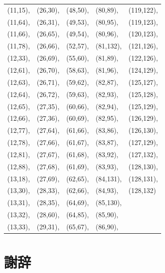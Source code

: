 \documentclass[a4,11pt]{article}
\begin{document}
\begin{center}
\begin{longtable}[p]{l l l l l}
(11,15),&(26,30),&(48,50),&(80,89),&(119,122),\\
(11,64),&(26,31),&(49,53),&(80,95),&(119,123),\\
(11,66),&(26,65),&(49,54),&(80,96),&(120,123),\\
(11,78),&(26,66),&(52,57),&(81,132),&(121,126),\\
(12,33),&(26,69),&(55,60),&(81,89),&(122,126),\\
(12,61),&(26,70),&(58,63),&(81,96),&(124,129),\\
(12,63),&(26,71),&(59,62),&(82,87),&(125,127),\\
(12,64),&(26,72),&(59,63),&(82,93),&(125,128),\\
(12,65),&(27,35),&(60,66),&(82,94),&(125,129),\\
(12,66),&(27,36),&(60,69),&(82,95),&(126,129),\\
(12,77),&(27,64),&(61,66),&(83,86),&(126,130),\\
(12,78),&(27,66),&(61,67),&(83,87),&(127,129),\\
(12,81),&(27,67),&(61,68),&(83,92),&(127,132),\\
(12,88),&(27,68),&(61,69),&(83,93),&(128,130),\\
(13,18),&(27,69),&(62,65),&(84,131),&(128,131),\\
(13,30),&(28,33),&(62,66),&(84,93),&(128,132)  \\
(13,31),&(28,35),&(64,69),&(85,130),&\\
(13,32),&(28,60),&(64,85),&(85,90),&\\
(13,33),&(29,31),&(65,67),&(86,90),&\\
\end{longtable}
\end{center}

\section{謝辞}



\end{document}
